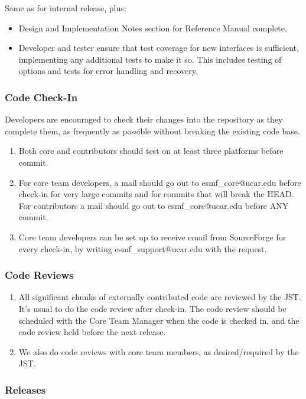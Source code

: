 Same as for internal release, plus:
\begin{itemize}
\item Design and Implementation Notes section for Reference Manual complete.
\item Developer and tester ensure that test coverage for new interfaces is sufficient, implementing any additional tests to make it so. This includes testing of options and tests for error handling and recovery.
\end{itemize}

\subsubsection{Code Check-In}

Developers are encouraged to check their changes into the repository
as they complete them, as frequently as possible without breaking the
existing code base.

\begin{enumerate}
\item Both core and contributors should test on at least three platforms before commit.
\item For core team developers, a mail should go out to esmf\_core@ucar.edu
before check-in for very large commits and for commits that will break the
HEAD. For contributors a mail should go out to esmf\_core@ucar.edu before
ANY commit.
\item Core team developers can be set up to receive email from SourceForge
for every check-in, by writing esmf\_support@ucar.edu with the request.
\end{enumerate}

\subsubsection{Code Reviews}
\begin{enumerate}
\item All significant chunks of externally contributed code are reviewed
by the JST. It's usual to do the code review after check-in. The code review should
be scheduled with the Core Team Manager when the code is checked in, and
the code review held before the next release.
\item We also do code reviews with core team members, as desired/required
by the JST. 
\end{enumerate}

\subsubsection {Releases}

